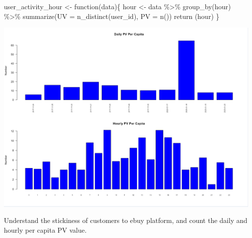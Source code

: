 \documentclass[
  11pt,
]{article}
\newenvironment{Shaded}{\begin{snugshade}}{\end{snugshade}}
\newcommand{\AttributeTok}[1]{\textcolor[rgb]{0.40,0.45,0.13}{#1}}
\newcommand{\ControlFlowTok}[1]{\textcolor[rgb]{0.00,0.23,0.31}{#1}}
\newcommand{\FunctionTok}[1]{\textcolor[rgb]{0.28,0.35,0.67}{#1}}
\newcommand{\NormalTok}[1]{\textcolor[rgb]{0.00,0.23,0.31}{#1}}
\newcommand{\OtherTok}[1]{\textcolor[rgb]{0.00,0.23,0.31}{#1}}
\newcommand{\SpecialCharTok}[1]{\textcolor[rgb]{0.37,0.37,0.37}{#1}}
\begin{document}
\begin{Shaded}
\begin{Highlighting}[]
\NormalTok{user\_activity\_hour }\OtherTok{\textless{}{-}} \ControlFlowTok{function}\NormalTok{(data)\{}
\NormalTok{    hour }\OtherTok{\textless{}{-}}\NormalTok{ data }\SpecialCharTok{\%\textgreater{}\%}
      \FunctionTok{group\_by}\NormalTok{(hour) }\SpecialCharTok{\%\textgreater{}\%}
      \FunctionTok{summarize}\NormalTok{(}\AttributeTok{UV =} \FunctionTok{n\_distinct}\NormalTok{(user\_id), }\AttributeTok{PV =} \FunctionTok{n}\NormalTok{())}
    \FunctionTok{return}\NormalTok{ (hour)}
\NormalTok{  \}}
\end{Highlighting}
\end{Shaded}

\includegraphics{img/pvuv3.png}

Understand the stickiness of customers to ebuy platform, and count the
daily and hourly per capita PV value.
\end{document}
